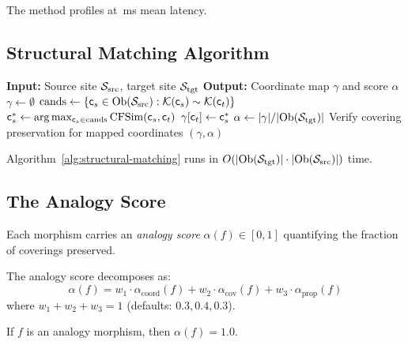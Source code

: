 \documentclass[11pt]{article}
\newcommand{\SourceSite}{\Site_{\mathrm{src}}}
\newcommand{\TargetSite}{\Site_{\mathrm{tgt}}}
\newcommand{\AnalogyScore}{\alpha}
\newcommand{\CompMap}{\gamma}
\newcommand{\StructSkel}{\mathcal{K}}
\begin{document}
The method profiles at \compProfChangeOfSiteMeanMs\,ms mean latency.

\subsection{Structural Matching Algorithm}

\begin{algorithm}[H]
\caption{Structural Matching for Analogy Morphisms}
\label{alg:structural-matching}
\begin{algorithmic}[1]
\STATE \textbf{Input:} Source site $\SourceSite$, target site $\TargetSite$
\STATE \textbf{Output:} Coordinate map $\CompMap$ and score $\AnalogyScore$
\STATE $\CompMap \gets \emptyset$
\FOR{each $\coord_t \in \Ob(\TargetSite)$}
  \STATE $\mathrm{cands} \gets \{\coord_s \in \Ob(\SourceSite) :
         \StructSkel(\coord_s) \sim \StructSkel(\coord_t)\}$
  \STATE $\mathsf{c}_s^* \gets \arg\max_{\mathsf{c}_s \in \mathrm{cands}}
         \mathrm{CFSim}(\mathsf{c}_s, \mathsf{c}_t)$
    \STATE $\CompMap[\coord_t] \gets \coord_s^*$
  \ENDIF
\ENDFOR
\STATE $\AnalogyScore \gets |\CompMap| / |\Ob(\TargetSite)|$
\STATE Verify covering preservation for mapped coordinates
\RETURN $(\CompMap, \AnalogyScore)$
\end{algorithmic}
\end{algorithm}

\begin{proposition}\label{prop:match-complex}
Algorithm~\ref{alg:structural-matching} runs in
$O(|\Ob(\TargetSite)| \cdot |\Ob(\SourceSite)|)$ time.
\end{proposition}

\subsection{The Analogy Score}
Each morphism carries an \emph{analogy score}
$\AnalogyScore(f) \in [0, 1]$ quantifying the fraction of coverings
preserved.

\begin{definition}\label{def:analogy-score}
The analogy score decomposes as:
\[
  \AnalogyScore(f) = w_1 \cdot \AnalogyScore_{\text{coord}}(f) +
  w_2 \cdot \AnalogyScore_{\text{cov}}(f) +
  w_3 \cdot \AnalogyScore_{\text{prop}}(f)
\]
where $w_1 + w_2 + w_3 = 1$ (defaults: $0.3, 0.4, 0.3$).
\end{definition}

\begin{proposition}\label{prop:score-mono}
If $f$ is an analogy morphism, then $\AnalogyScore(f) = 1.0$.
\end{proposition}
\end{document}
